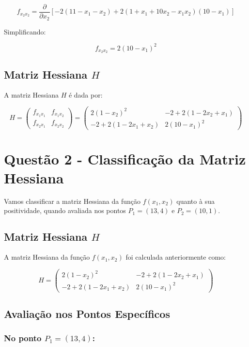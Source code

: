 \documentclass[a4paper, 12pt]{article}
\begin{document}
\[
f_{x_2x_2} = \frac{\partial}{\partial x_2} \left[-2(11 - x_1 - x_2) + 2(1 + x_1 + 10x_2 - x_1x_2)(10 - x_1)\right]
\]

Simplificando:

\[
f_{x_2x_2} = 2(10 - x_1)^2
\]

\subsection{Matriz Hessiana \( H \)}

A matriz Hessiana \( H \) é dada por:

\[
H = \begin{pmatrix}
f_{x_1x_1} & f_{x_1x_2} \\
f_{x_2x_1} & f_{x_2x_2}
\end{pmatrix}
= \begin{pmatrix}
2(1 - x_2)^2 & -2 + 2(1 - 2x_2 + x_1) \\
-2 + 2(1 - 2x_1 + x_2) & 2(10 - x_1)^2
\end{pmatrix}
\]


\newpage
\section{Questão 2 - Classificação da Matriz Hessiana}
Vamos classificar a matriz Hessiana da função \( f(x_1, x_2) \) quanto à sua positividade, quando avaliada nos pontos \( P_1 = (13, 4) \) e \( P_2 = (10, 1) \).

\subsection{Matriz Hessiana \( H \)}

A matriz Hessiana da função \( f(x_1, x_2) \) foi calculada anteriormente como:

\[
H = \begin{pmatrix}
2(1 - x_2)^2 & -2 + 2(1 - 2x_2 + x_1) \\
-2 + 2(1 - 2x_1 + x_2) & 2(10 - x_1)^2
\end{pmatrix}
\]

\subsection{Avaliação nos Pontos Específicos}

\subsubsection{No ponto \( P_1 = (13, 4) \):}
\end{document}

